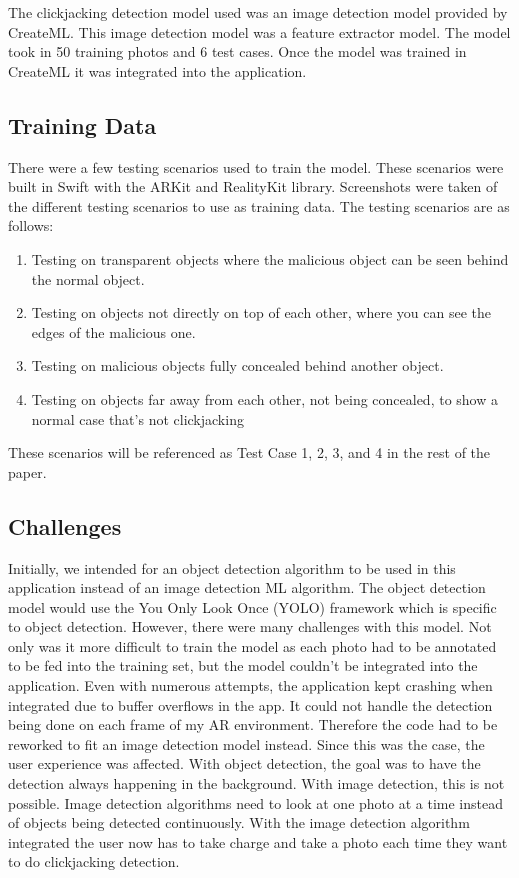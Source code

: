 \documentclass[conference]{IEEEtran}
\begin{document}
The clickjacking detection model used was an image detection model provided by CreateML. This image detection model was a feature extractor model. The model took in 50 training photos and 6 test cases. Once the model was trained in CreateML it was integrated into the application.

\subsection{Training Data}

There were a few testing scenarios used to train the model. These scenarios were built in Swift with the ARKit and RealityKit library. Screenshots were taken of the different testing scenarios to use as training data. The testing scenarios are as follows: 

\begin{enumerate}
    \item Testing on transparent objects where the malicious object can be seen behind the normal object.
    \item Testing on objects not directly on top of each other, where you can see the edges of the malicious one.
    \item Testing on malicious objects fully concealed behind another object.
    \item Testing on objects far away from each other, not being concealed, to show a normal case that's not clickjacking 
\end{enumerate}

These scenarios will be referenced as Test Case 1, 2, 3, and 4 in the rest of the paper. 

\subsection{Challenges}

Initially, we intended for an object detection algorithm to be used in this application instead of an image detection ML algorithm. The object detection model would use the You Only Look Once (YOLO) framework which is specific to object detection. However, there were many challenges with this model. Not only was it more difficult to train the model as each photo had to be annotated to be fed into the training set, but the model couldn't be integrated into the application. Even with numerous attempts, the application kept crashing when integrated due to buffer overflows in the app. It could not handle the detection being done on each frame of my AR environment. Therefore the code had to be reworked to fit an image detection model instead. Since this was the case, the user experience was affected. With object detection, the goal was to have the detection always happening in the background. With image detection, this is not possible. Image detection algorithms need to look at one photo at a time instead of objects being detected continuously. With the image detection algorithm integrated the user now has to take charge and take a photo each time they want to do clickjacking detection. 
\end{document}

